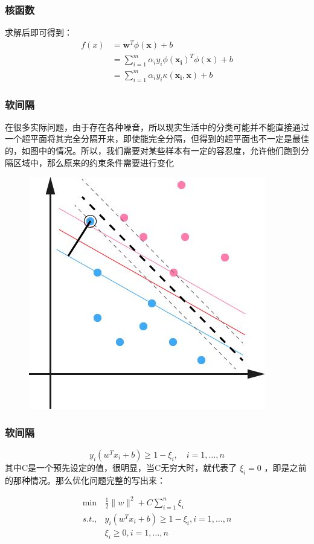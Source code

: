 \begin{frame}

\frametitle{核函数}

求解后即可得到：
\begin{align*}
f(x)&=\boldsymbol{w}^T\phi(\boldsymbol{x})+b\\
&=\sum_{i=1}^m\alpha_i y_i \phi(\boldsymbol{x_i})^T\phi(\boldsymbol{x})+b\\
&= \sum_{i=1}^m\alpha_i y_i \kappa(\boldsymbol{x_i, x}) + b
\end{align*}
\end{frame}



\begin{frame}

\frametitle{软间隔}
 在很多实际问题，由于存在各种噪音，所以现实生活中的分类可能并不能直接通过一个超平面将其完全分隔开来，即使能完全分隔，但得到的超平面也不一定是最佳的，如图中的情况。所以，我们需要对某些样本有一定的容忍度，允许他们跑到分隔区域中，那么原来的约束条件需要进行变化
 \begin{figure}[ht]
	\centering
	\includegraphics[width=0.5\linewidth]{partition/img/svm_12.jpg}  
	\end{figure}
 
\end{frame}


\begin{frame}

\frametitle{软间隔}
\[
y_i(w^Tx_i+b)\geq 1-\xi_i, \quad i=1,\ldots,n
\]
其中C是一个预先设定的值，很明显，当C无穷大时，就代表了 $\xi_i=0$ ，即是之前的那种情况。那么优化问题完整的写出来：

\begin{align*}
\min & \frac{1}{2}\|w\|^2 + C\sum_{i=1}^n\xi_i \\
 s.t., & y_i(w^Tx_i+b)\geq 1-\xi_i, i=1,\ldots,n \\
& \xi_i \geq 0, i=1,\ldots,n 
\end{align*}


\end{frame}


